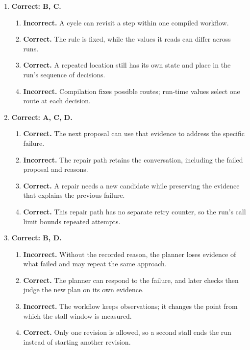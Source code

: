 \begin{enumerate}[start=21,itemsep=0.7\baselineskip]
\item[{\hyperref[exercise:24]{24.}}] \begin{minipage}[t]{\linewidth}
\textbf{Correct: B, C.}
\begin{enumerate}[label=\textnormal{(\Alph*)},leftmargin=*,itemsep=0pt]
\item \textbf{Incorrect.} A cycle can revisit a step within one compiled workflow.
\item \textbf{Correct.} The rule is fixed, while the values it reads can differ across runs.
\item \textbf{Correct.} A repeated location still has its own state and place in the run's sequence of decisions.
\item \textbf{Incorrect.} Compilation fixes possible routes; run-time values select one route at each decision.
\end{enumerate}
\end{minipage}

\item[{\hyperref[exercise:25]{25.}}] \begin{minipage}[t]{\linewidth}
\textbf{Correct: A, C, D.}
\begin{enumerate}[label=\textnormal{(\Alph*)},leftmargin=*,itemsep=0pt]
\item \textbf{Correct.} The next proposal can use that evidence to address the specific failure.
\item \textbf{Incorrect.} The repair path retains the conversation, including the failed proposal and reasons.
\item \textbf{Correct.} A repair needs a new candidate while preserving the evidence that explains the previous failure.
\item \textbf{Correct.} This repair path has no separate retry counter, so the run's call limit bounds repeated attempts.
\end{enumerate}
\end{minipage}

\item[{\hyperref[exercise:26]{26.}}] \begin{minipage}[t]{\linewidth}
\textbf{Correct: B, D.}
\begin{enumerate}[label=\textnormal{(\Alph*)},leftmargin=*,itemsep=0pt]
\item \textbf{Incorrect.} Without the recorded reason, the planner loses evidence of what failed and may repeat the same approach.
\item \textbf{Correct.} The planner can respond to the failure, and later checks then judge the new plan on its own evidence.
\item \textbf{Incorrect.} The workflow keeps observations; it changes the point from which the stall window is measured.
\item \textbf{Correct.} Only one revision is allowed, so a second stall ends the run instead of starting another revision.
\end{enumerate}
\end{minipage}


\end{enumerate}
